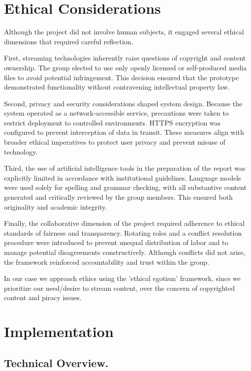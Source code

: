 \documentclass[11pt]{article}
\begin{document}
\newpage
\section{Ethical Considerations}
Although the project did not involve human subjects, it engaged several ethical dimensions that required careful reflection.

First, streaming technologies inherently raise questions of copyright and content ownership. The group elected to use only openly licensed or self-produced media files to avoid potential infringement. This decision ensured that the prototype demonstrated functionality without contravening intellectual property law.

Second, privacy and security considerations shaped system design. Because the system operated as a network-accessible service, precautions were taken to restrict deployment to controlled environments. HTTPS encryption was configured to prevent interception of data in transit. These measures align with broader ethical imperatives to protect user privacy and prevent misuse of technology.

Third, the use of artificial intelligence tools in the preparation of the report was explicitly limited in accordance with institutional guidelines. Language models were used solely for spelling and grammar checking, with all substantive content generated and critically reviewed by the group members. This ensured both originality and academic integrity.

Finally, the collaborative dimension of the project required adherence to ethical standards of fairness and transparency. Rotating roles and a conflict resolution procedure were introduced to prevent unequal distribution of labor and to manage potential disagreements constructively. Although conflicts did not arise, the framework reinforced accountability and trust within the group.

In our case we approach ethics using the 'ethical egotism' framework, since we prioritize our need/desire to stream content, over the concern of copyrighted content and piracy issues.
\newpage
\section{Implementation}
\subsection{Technical Overview.}
\end{document}
